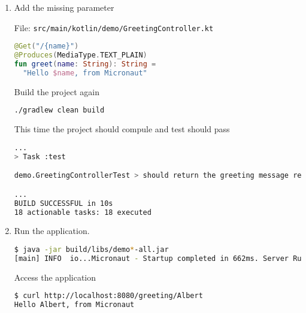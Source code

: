 \begin{enumerate}
Build the project

\begin{lstlisting}[language=bash]
./gradlew clean build
\end{lstlisting}

The compiler will fail

\begin{lstlisting}[language=bash]
...
> Task :kaptKotlin FAILED
/Users/albertattard/work/projects/albertattard/demo/build/tmp/kapt3/stubs/main/demo/GreetingController.java:12: error: The route declares a uri variable named [name], but no corresponding method argument is present
    public final java.lang.String greet() {
                                  ^Note: Creating bean classes for 2 ...

FAILURE: Build failed with an exception.
...
\end{lstlisting}

Micronaut resolves everything at compile time.

\item Add the missing parameter

File: \texttt{src/main/kotlin/demo/GreetingController.kt}
\begin{lstlisting}[language=Kotlin]
@Get("/{name}")
@Produces(MediaType.TEXT_PLAIN)
fun greet(name: String): String =
  "Hello $name, from Micronaut"
\end{lstlisting}

Build the project again

\begin{lstlisting}[language=bash]
./gradlew clean build
\end{lstlisting}

This time the project should compule and test should pass

\begin{lstlisting}[language=bash]
...
> Task :test

demo.GreetingControllerTest > should return the greeting message returned by the greeting service PASSED

...
BUILD SUCCESSFUL in 10s
18 actionable tasks: 18 executed
\end{lstlisting}

\item Run the application.

\begin{lstlisting}[language=bash]
$ java -jar build/libs/demo*-all.jar
[main] INFO  io...Micronaut - Startup completed in 662ms. Server Running: http://localhost:8080
\end{lstlisting}

Access the application

\begin{lstlisting}[language=bash]
$ curl http://localhost:8080/greeting/Albert
Hello Albert, from Micronaut
\end{lstlisting}

\end{enumerate}
